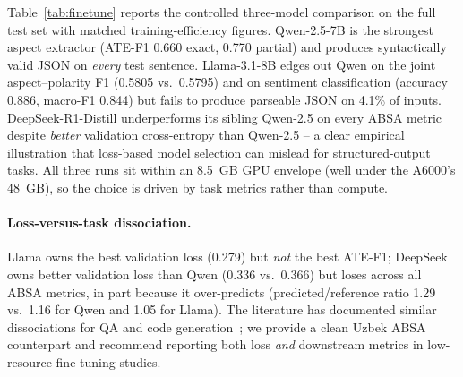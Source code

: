 \documentclass[runningheads]{llncs}
\begin{document}
Table~\ref{tab:finetune} reports the controlled three-model comparison on
the full test set with matched training-efficiency figures. Qwen-2.5-7B is
the strongest aspect extractor (ATE-F1 0.660 exact, 0.770 partial) and
produces syntactically valid JSON on \emph{every} test sentence.
Llama-3.1-8B edges out Qwen on the joint aspect--polarity F1
(0.5805 vs.\ 0.5795) and on sentiment classification (accuracy 0.886,
macro-F1 0.844) but fails to produce parseable JSON on 4.1\% of inputs.
DeepSeek-R1-Distill underperforms its sibling Qwen-2.5 on every ABSA
metric despite \emph{better} validation cross-entropy than Qwen-2.5 --
a clear empirical illustration that loss-based model selection can
mislead for structured-output tasks. All three runs sit within an
8.5~GB GPU envelope (well under the A6000's 48~GB), so the choice is
driven by task metrics rather than compute.

\begin{table}[!htbp]
\centering
\caption{Fine-tuned three-model ABSA comparison on the 618-sentence
test split, with matched QLoRA training-efficiency figures. ``Pair F1''
is E2E aspect--polarity F1 (primary metric); ``Acc.''/``Mac-F1'' are
sentiment-classification metrics on matched pairs; ``Loss'' is the best
evaluation cross-entropy; ``Min'' is wall-clock training time.}
\label{tab:finetune}
\renewcommand{\arraystretch}{1.1}
\setlength{\tabcolsep}{4pt}
\end{table}

\paragraph{Loss-versus-task dissociation.} Llama owns the best validation
loss (0.279) but \emph{not} the best ATE-F1; DeepSeek owns better
validation loss than Qwen (0.336 vs.\ 0.366) but loses across all ABSA
metrics, in part because it over-predicts (predicted/reference ratio
1.29 vs.\ 1.16 for Qwen and 1.05 for Llama). The literature has documented
similar dissociations for QA and code
generation~\cite{10.1145/3777411}; we provide a clean Uzbek ABSA
counterpart and recommend reporting both loss \emph{and} downstream
metrics in low-resource fine-tuning studies.
\end{document}
